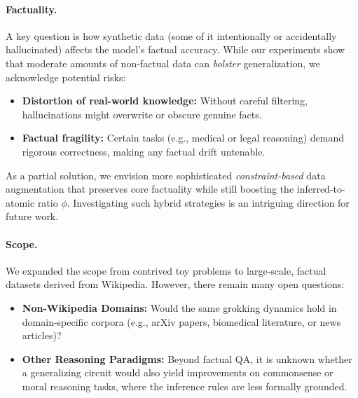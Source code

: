 \paragraph{Factuality.}
A key question is how synthetic data (some of it intentionally or accidentally hallucinated) affects the model’s factual accuracy. While our experiments show that moderate amounts of non-factual data can \emph{bolster} generalization, we acknowledge potential risks:
\begin{itemize}
    \item \textbf{Distortion of real-world knowledge:} Without careful filtering, hallucinations might overwrite or obscure genuine facts.
    \item \textbf{Factual fragility:} Certain tasks (e.g., medical or legal reasoning) demand rigorous correctness, making any factual drift untenable.
\end{itemize}
As a partial solution, we envision more sophisticated \emph{constraint-based} data augmentation that preserves core factuality while still boosting the inferred-to-atomic ratio \(\phi\). Investigating such hybrid strategies is an intriguing direction for future work.

\paragraph{Scope.}
We expanded the scope from contrived toy problems to large-scale, factual datasets derived from Wikipedia. However, there remain many open questions:
\begin{itemize}
    \item \textbf{Non-Wikipedia Domains:} Would the same grokking dynamics hold in domain-specific corpora (e.g., arXiv papers, biomedical literature, or news articles)?
    \item \textbf{Other Reasoning Paradigms:} Beyond factual QA, it is unknown whether a generalizing circuit would also yield improvements on commonsense or moral reasoning tasks, where the inference rules are less formally grounded.
\end{itemize}

